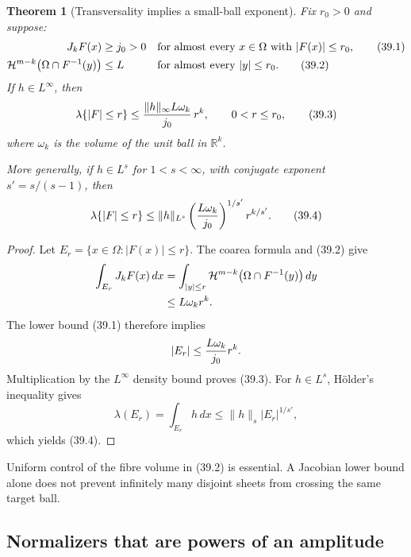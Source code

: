 \documentclass[11pt]{article}
\newtheorem{theorem}{Theorem}[section]
\theoremstyle{remark}
\begin{document}
\begin{theorem}[Transversality implies a small-ball exponent]
\label{thm:v12v39-coarea}
Fix \(r_0>0\) and suppose:
\begin{align}
 J_kF(x)&\geq j_0>0
 &&\text{for almost every }x\in\Omega
                 \text{ with }|F(x)|\leq r_0,    \tag{39.1}\\
 {\cal H}^{m-k}\bigl(\Omega\cap F^{-1}(y)\bigr)
 &\leq L
 &&\text{for almost every }|y|\leq r_0.          \tag{39.2}
\end{align}
If \(h\in L^\infty\), then
\begin{equation}
 \lambda\{|F|\leq r\}
 \leq
 {\|h\|_\infty L\omega_k\over j_0}\,r^k,
 \qquad 0<r\leq r_0,                             \tag{39.3}
\end{equation}
where \(\omega_k\) is the volume of the unit ball in
\(\mathbb R^k\).

More generally, if \(h\in L^s\) for \(1<s<\infty\), with conjugate
exponent \(s'=s/(s-1)\), then
\begin{equation}
 \lambda\{|F|\leq r\}
 \leq
 \|h\|_{L^s}
 \left({L\omega_k\over j_0}\right)^{1/s'}
 r^{k/s'}.                                       \tag{39.4}
\end{equation}
\end{theorem}

\begin{proof}
Let \(E_r=\{x\in\Omega:|F(x)|\leq r\}\).  The coarea formula and
(39.2) give
\begin{align*}
 \int_{E_r}J_kF(x)\,dx
 &=
 \int_{|y|\leq r}
 {\cal H}^{m-k}\bigl(\Omega\cap F^{-1}(y)\bigr)\,dy\\
 &\leq L\omega_kr^k.
\end{align*}
The lower bound (39.1) therefore implies
\[
 |E_r|\leq {L\omega_k\over j_0}r^k.
\]
Multiplication by the \(L^\infty\) density bound proves (39.3).
For \(h\in L^s\), H\"older's inequality gives
\[
 \lambda(E_r)=\int_{E_r}h\,dx
 \leq\|h\|_s|E_r|^{1/s'},
\]
which yields (39.4).
\end{proof}

Uniform control of the fibre volume in (39.2) is essential.  A
Jacobian lower bound alone does not prevent infinitely many
disjoint sheets from crossing the same target ball.

\subsection{Normalizers that are powers of an amplitude}
\end{document}
